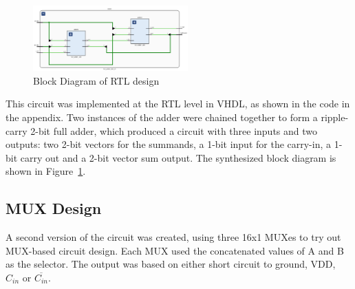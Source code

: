 \documentclass{article}
\begin{document}
\begin{figure}[H]
    \centering
    \includegraphics[width=0.53\textwidth]{rtl-schematic.png}
    \caption{Block Diagram of RTL design}
    \label{fig:rtl-schematic}
\end{figure}

This circuit was implemented at the RTL level in VHDL, as shown in the code in the appendix.
Two instances of the adder were chained together to form a ripple-carry 2-bit full adder,
which produced a circuit with three inputs and two outputs: two 2-bit vectors for the summands,
a 1-bit input for the carry-in, a 1-bit carry out and a 2-bit vector sum output.
The synthesized block diagram is shown in Figure~\ref{fig:rtl-schematic}.

\subsection{MUX Design}

A second version of the circuit was created, using three 16x1 MUXes to try out MUX-based circuit design.
Each MUX used the concatenated values of A and B as the selector.
The output was based on either short circuit to ground, VDD, $C_{in}$ or $\overline{C_{in}}$.
\end{document}
